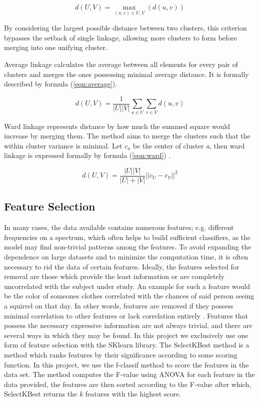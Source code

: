 \begin{equation}
\label{eqn:complete}
d(U, V) = \max\limits_{(u, v) \in U, V}(d(u, v))
\end{equation}

By considering the largest possible distance between two clusters, this criterion bypasses the setback of single linkage, allowing more clusters to form before merging into one unifying cluster.

Average linkage calculates the average between all elements for every pair of clusters and merges the ones possessing minimal average distance. It is formally described by formula (\ref{eqn:average}).

\begin{equation}
\label{eqn:average}
d(U, V) = \frac{1}{|U||V|}\sum\limits_{u\in U} \sum\limits_{v\in V}  d(u, v)
\end{equation}

Ward linkage represents distance by how much the summed square would increase by merging them. The method aims to merge the clusters such that the within cluster variance is minimal. Let $c_a$ be the center of cluster \textit{a}, then ward linkage is expressed formally by formula (\ref{eqn:ward}) \cite{shalizi2009distances}.


\begin{equation}
\label{eqn:ward}
d(U, V) = \frac{|U||V|}{|U|+|V|}||c_U - c_V||^2
\end{equation}



\subsection{Feature Selection}

In many cases, the data available contains numerous features; e.g. different frequencies on a spectrum, which often helps to build sufficient classifiers, as the model may find non-trivial patterns among the features. To avoid expanding the dependence on large datasets and to minimize the computation time, it is often necessary to rid the data of certain features.  
Ideally, the features selected for removal are those which provide the least information or are completely uncorrelated with the subject under study. An example for such a feature would be the color of someones clothes correlated with the chances of said person seeing a squirrel on that day. In other words, features are removed if they possess minimal correlation to other features or lack correlation entirely \cite{dash1997feature}. Features that possess the necessary expressive information are not always trivial, and there are several ways in which they may be found. In this project we exclusively use one form of feature selection with the SKlearn library. The SelectKBest method is a method which ranks features by their significance according to some scoring function. In this project, we use the f-classif method to score the features in the data set. The method computes the F-value using ANOVA for each feature in the data provided, the features are then sorted according to the F-value after which, SelectKBest returns the $k$ features with the highest score.


